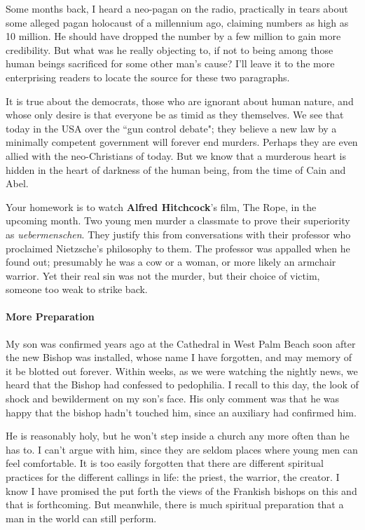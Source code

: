 Some months back, I heard a neo-pagan on the radio, practically in tears about some alleged pagan holocaust of a millennium ago, claiming numbers as high as 10 million. He should have dropped the number by a few million to gain more credibility. But what was he really objecting to, if not to being among those human beings sacrificed for some other man's cause? I'll leave it to the more enterprising readers to locate the source for these two paragraphs.

It is true about the democrats, those who are ignorant about human nature, and whose only desire is that everyone be as timid as they themselves. We see that today in the USA over the ``gun control debate"; they believe a new law by a minimally competent government will forever end murders. Perhaps they are even allied with the neo-Christians of today. But we know that a murderous heart is hidden in the heart of darkness of the human being, from the time of Cain and Abel.

Your homework is to watch \textbf{Alfred Hitchcock}'s film, The Rope, in the upcoming month. Two young men murder a classmate to prove their superiority as \emph{uebermenschen}. They justify this from conversations with their professor who proclaimed Nietzsche's philosophy to them. The professor was appalled when he found out; presumably he was a cow or a woman, or more likely an armchair warrior. Yet their real sin was not the murder, but their choice of victim, someone too weak to strike back.

\paragraph{More Preparation}
My son was confirmed years ago at the Cathedral in West Palm Beach soon after the new Bishop was installed, whose name I have forgotten, and may memory of it be blotted out forever. Within weeks, as we were watching the nightly news, we heard that the Bishop had confessed to pedophilia. I recall to this day, the look of shock and bewilderment on my son's face. His only comment was that he was happy that the bishop hadn't touched him, since an auxiliary had confirmed him.

He is reasonably holy, but he won't step inside a church any more often than he has to. I can't argue with him, since they are seldom places where young men can feel comfortable. It is too easily forgotten that there are different spiritual practices for the different callings in life: the priest, the warrior, the creator. I know I have promised the put forth the views of the Frankish bishops on this and that is forthcoming. But meanwhile, there is much spiritual preparation that a man in the world can still perform.

